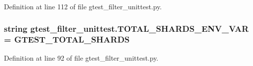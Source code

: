 Definition at line 112 of file gtest\+\_\+filter\+\_\+unittest.\+py.

\subsubsection[{\texorpdfstring{T\+O\+T\+A\+L\+\_\+\+S\+H\+A\+R\+D\+S\+\_\+\+E\+N\+V\+\_\+\+V\+AR}{TOTAL_SHARDS_ENV_VAR}}]{\setlength{\rightskip}{0pt plus 5cm}string gtest\+\_\+filter\+\_\+unittest.\+T\+O\+T\+A\+L\+\_\+\+S\+H\+A\+R\+D\+S\+\_\+\+E\+N\+V\+\_\+\+V\+AR = \textquotesingle{}G\+T\+E\+S\+T\+\_\+\+T\+O\+T\+A\+L\+\_\+\+S\+H\+A\+R\+DS\textquotesingle{}}\hypertarget{namespacegtest__filter__unittest_a3b9a50b994f774c1cebbc52971708e4e}{}\label{namespacegtest__filter__unittest_a3b9a50b994f774c1cebbc52971708e4e}


Definition at line 92 of file gtest\+\_\+filter\+\_\+unittest.\+py.

